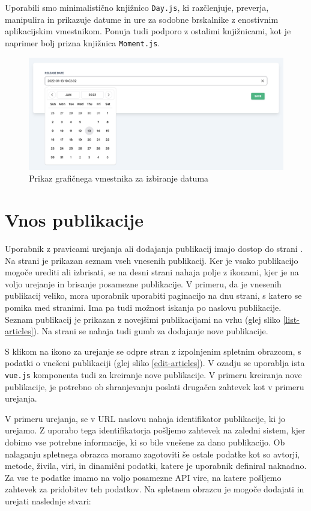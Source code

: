 \documentclass[a4paper, 12pt]{book}
\begin{document}
Uporabili smo minimalistično knjižnico \verb=Day.js=, ki razčlenjuje, preverja, manipulira in prikazuje datume in ure za sodobne brskalnike z enostivnim aplikacijskim vmestnikom. Ponuja tudi podporo z ostalimi knjižnicami, kot je naprimer bolj prizna knjižnica \verb=Moment.js=.


\begin{figure}[h]
\begin{center}
\includegraphics[width=1\textwidth]{slike/type_date.png}
\end{center}
\caption{ Prikaz grafičnega vmestnika za izbiranje datuma }
\label{type-date}
\end{figure}


\section{Vnos publikacije}
Uporabnik z pravicami urejanja ali dodajanja publikacij imajo dostop do strani . Na strani je prikazan seznam vseh vnesenih publikacij. Ker je vsako publikacijo mogoče urediti ali izbrisati, se na desni strani nahaja polje z ikonami, kjer je na voljo urejanje in brisanje posamezne publikacije. V primeru, da je vnesenih publikacij veliko, mora uporabnik uporabiti paginacijo na dnu strani, s katero se pomika med stranimi. Ima pa tudi možnost iskanja po naslovu publikacije. Seznam publikacij je prikazan z novejšimi publikacijami na vrhu (glej sliko \ref{list-articles}). Na strani se nahaja tudi gumb za dodajanje nove publikacije.

S klikom na ikono za urejanje se odpre stran z izpolnjenim spletnim obrazcom, s podatki o vnešeni publikaciji (glej sliko \ref{edit-articles}). V ozadju se uporablja ista \verb=vue.js= komponenta tudi za kreiranje nove publikacije. V primeru kreiranja nove publikacije, je potrebno ob shranjevanju poslati drugačen zahtevek kot v primeru urejanja. 

V primeru urejanja, se v URL naslovu nahaja identifikator publikacije, ki jo urejamo. Z uporabo tega identifikatorja pošljemo zahtevek na zaledni sistem, kjer dobimo vse potrebne informacije, ki so bile vnešene za dano publikacijo. Ob nalaganju spletnega obrazca moramo zagotoviti še ostale podatke kot so avtorji, metode, živila, viri, in dinamični podatki, katere je uporabnik definiral naknadno. Za vse te podatke imamo na voljo posamezne API vire, na katere pošljemo zahtevek za pridobitev teh podatkov. Na spletnem obrazcu je mogoče dodajati in urejati naslednje stvari:
\end{document}
